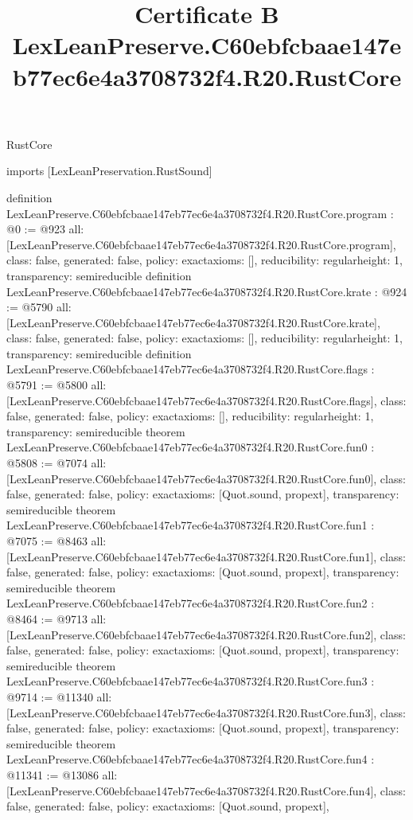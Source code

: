\begin{lexlean}{RustCore}
\title{Certificate B LexLeanPreserve.C60ebfcbaae147eb77ec6e4a3708732f4.R20.RustCore}
\begin{coremodule}
imports [LexLeanPreservation.RustSound]

definition LexLeanPreserve.C60ebfcbaae147eb77ec6e4a3708732f4.R20.RustCore.program : @0 := @923 {
  all: [LexLeanPreserve.C60ebfcbaae147eb77ec6e4a3708732f4.R20.RustCore.program],
  class: false,
  generated: false,
  policy: exact{axioms: []},
  reducibility: regular{height: 1},
  transparency: semireducible
}
definition LexLeanPreserve.C60ebfcbaae147eb77ec6e4a3708732f4.R20.RustCore.krate : @924 := @5790 {
  all: [LexLeanPreserve.C60ebfcbaae147eb77ec6e4a3708732f4.R20.RustCore.krate],
  class: false,
  generated: false,
  policy: exact{axioms: []},
  reducibility: regular{height: 1},
  transparency: semireducible
}
definition LexLeanPreserve.C60ebfcbaae147eb77ec6e4a3708732f4.R20.RustCore.flags : @5791 := @5800 {
  all: [LexLeanPreserve.C60ebfcbaae147eb77ec6e4a3708732f4.R20.RustCore.flags],
  class: false,
  generated: false,
  policy: exact{axioms: []},
  reducibility: regular{height: 1},
  transparency: semireducible
}
theorem LexLeanPreserve.C60ebfcbaae147eb77ec6e4a3708732f4.R20.RustCore.fun0 : @5808 := @7074 {
  all: [LexLeanPreserve.C60ebfcbaae147eb77ec6e4a3708732f4.R20.RustCore.fun0],
  class: false,
  generated: false,
  policy: exact{axioms: [Quot.sound, propext]},
  transparency: semireducible
}
theorem LexLeanPreserve.C60ebfcbaae147eb77ec6e4a3708732f4.R20.RustCore.fun1 : @7075 := @8463 {
  all: [LexLeanPreserve.C60ebfcbaae147eb77ec6e4a3708732f4.R20.RustCore.fun1],
  class: false,
  generated: false,
  policy: exact{axioms: [Quot.sound, propext]},
  transparency: semireducible
}
theorem LexLeanPreserve.C60ebfcbaae147eb77ec6e4a3708732f4.R20.RustCore.fun2 : @8464 := @9713 {
  all: [LexLeanPreserve.C60ebfcbaae147eb77ec6e4a3708732f4.R20.RustCore.fun2],
  class: false,
  generated: false,
  policy: exact{axioms: [Quot.sound, propext]},
  transparency: semireducible
}
theorem LexLeanPreserve.C60ebfcbaae147eb77ec6e4a3708732f4.R20.RustCore.fun3 : @9714 := @11340 {
  all: [LexLeanPreserve.C60ebfcbaae147eb77ec6e4a3708732f4.R20.RustCore.fun3],
  class: false,
  generated: false,
  policy: exact{axioms: [Quot.sound, propext]},
  transparency: semireducible
}
theorem LexLeanPreserve.C60ebfcbaae147eb77ec6e4a3708732f4.R20.RustCore.fun4 : @11341 := @13086 {
  all: [LexLeanPreserve.C60ebfcbaae147eb77ec6e4a3708732f4.R20.RustCore.fun4],
  class: false,
  generated: false,
  policy: exact{axioms: [Quot.sound, propext]},
}
\end{coremodule}
\end{lexlean}
